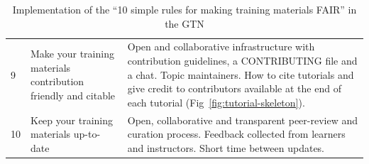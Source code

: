 \begin{table}[h!t]
\begin{tabular}{|l|p{}|p{}|}
		9  & {\raggedright Make your training materials contribution friendly and citable}             & Open and collaborative infrastructure with contribution guidelines, a CONTRIBUTING file and a chat. Topic maintainers. How to cite tutorials and give credit to contributors available at the end of each tutorial (Fig~\ref{fig:tutorial-skeleton}).\\
		10 & {\raggedright Keep your training materials up-to-date}                                    & Open, collaborative and transparent peer-review and curation process. Feedback collected from learners and instructors. Short time between updates. \\
		\hline
	\end{tabular}
    \caption{Implementation of the ``10 simple rules for making training materials FAIR'' \cite{Garcia2020} in the GTN}\label{S2_Table}
\end{table}

